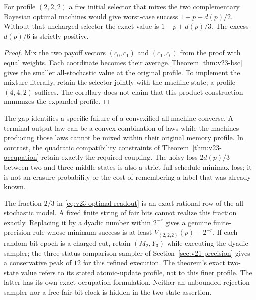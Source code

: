 \begin{corollary}
\label{cor:v23-mixing-gap}
For profile $(2,2,2)$ a free initial selector that mixes the two
complementary Bayesian optimal machines would give worst-case success
$1-p+d(p)/2$. Without that uncharged selector the exact value is
$1-p+d(p)/3$. The excess $d(p)/6$ is strictly positive.
\end{corollary}
\begin{proof}
Mix the two payoff vectors $(c_0,c_1)$ and $(c_1,c_0)$ from the proof
with equal weights. Each coordinate becomes their average. Theorem
\ref{thm:v23-bsc} gives the smaller all-stochastic value at the original
profile. To implement the mixture literally, retain the selector
jointly with the machine state; a profile $(4,4,2)$ suffices. The
corollary does not claim that this product construction minimizes the
expanded profile.
\end{proof}

The gap identifies a specific failure of a convexified all-machine
converse. A terminal output law can be a convex combination of laws
while the machines producing those laws cannot be mixed within their
original memory profile. In contrast, the quadratic compatibility
constraints of Theorem~\ref{thm:v23-occupation} retain exactly the
required coupling. The noisy loss $2d(p)/3$ between two and three middle
states is also a strict full-schedule minimax loss; it is not an erasure
probability or the cost of remembering a label that was already known.

\begin{remark}
\label{rem:v23-bsc-precision}
The fraction $2/3$ in \eqref{eq:v23-optimal-readout} is an exact rational
row of the all-stochastic model. A fixed finite string of fair bits
cannot realize this fraction exactly. Replacing it by a dyadic number
within $2^{-r}$ gives a genuine finite-precision rule whose minimum
success is at least $V_{(2,2,2)}(p)-2^{-r}$. If each random-bit epoch is
a charged cut, retain $(M_2,Y_3)$ while executing the dyadic sampler;
the three-status comparison sampler of
Section~\ref{sec:v21-precision} gives a conservative peak of $12$ for
this refined execution. The theorem's exact two-state value refers to
its stated atomic-update profile, not to this finer profile. The latter
has its own exact occupation formulation. Neither an unbounded rejection
sampler nor a free fair-bit clock is hidden in the two-state assertion.
\end{remark}

